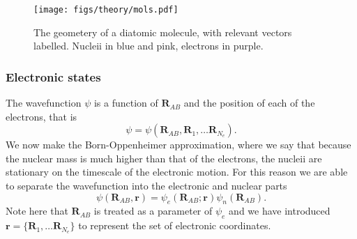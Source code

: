 \begin{figure}
  \centering
  \texttt{[image: figs/theory/mols.pdf]}
  \caption{
    The geometery of a diatomic molecule, with relevant vectors labelled.
    Nucleii in blue and pink, electrons in purple.
  }
  \label{theory:fig:mol}
\end{figure}


\subsubsection{Electronic states}

The wavefunction
$\psi$ is a function of $\mathbf{R}_{AB}$ and the position of each of the
electrons, that is
%
\begin{equation}
  \psi = \psi(\mathbf{R}_{AB}, \mathbf{R}_1, \dots \mathbf{R}_{N_e}).
\end{equation}
%
We now make the Born-Oppenheimer approximation, where we say that because the
nuclear mass is much higher than that of the electrons, the nucleii are
stationary on the timescale of the electronic motion. For this
reason we are able to separate the wavefunction into the electronic and nuclear
parts
%
\begin{equation}
  \psi(\mathbf{R}_{AB}, \mathbf{r}) = \psi_e(\mathbf{R}_{AB}; \mathbf{r})
  \psi_n(\mathbf{R}_{AB}).
\end{equation}
%
Note here that $\mathbf{R}_{AB}$ is treated as a parameter of $\psi_e$ and we
have introduced $\mathbf{r} = \{\mathbf{R}_1, \dots \mathbf{R}_{N_e} \}$ to
represent the set of electronic coordinates.


